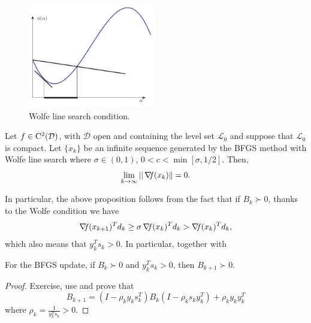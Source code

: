\documentclass[10pt,a4paper]{article}
\begin{document}
\begin{figure}
	\centering
	\includegraphics[width=0.5\textwidth]{weak_wolfe}
	\caption{Wolfe line search condition.}
	\label{fig:wolfe}
\end{figure}

\begin{proposition} Let $f \in \mathord{\mathrm{C^2}}(\mathcal{D})$, with $\mathcal{D}$ open and containing the level set $\mathcal{L}_0$ and suppose that $\mathcal{L}_0$ is compact. Let $\{x_k\}$ be an infinite sequence generated by the BFGS method with Wolfe line search where $\sigma \in (0, 1)$, $0 < c < \min[\sigma, 1/2]$. Then,
	$$ \lim_{k\to \infty} ||\operatorname*{\mathit{\nabla \!f}}(x_k)\| = 0.$$
\end{proposition}
\noindent In particular, the above proposition follows from the fact that if $B_k\succ 0$, thanks to the Wolfe condition we have
$$ \operatorname*{\mathit{\nabla \!f}}(x_{k+1})^Td_k \geq \sigma \operatorname*{\mathit{\nabla \!f}}(x_k)^Td_k > \operatorname*{\mathit{\nabla \!f}}(x_k)^Td_k,$$
which also means that $y_k^Ts_k>0$. In particular, together with 
\begin{lemma}
	For the BFGS update, if $B_k \succ 0$ and $y_k^T s_k > 0$, then $B_{k+1} \succ 0$.
\end{lemma}
\begin{proof}
	Exercise, use and prove that 
	\begin{equation*}
		B_{k+1} = (I - \rho_k y_k s_k^T) B_k (I - \rho_k s_k y_k^T) + \rho_k y_k y_k^T
	\end{equation*}
	where $\rho_k = \frac{1}{y_k^T s_k} > 0$.
\end{proof}
\end{document}
